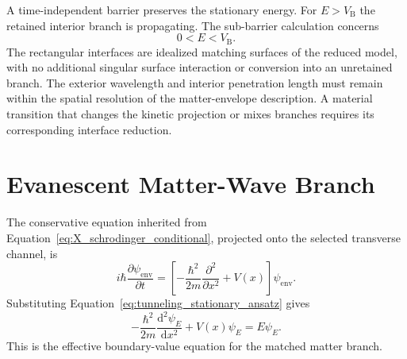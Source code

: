 A time-independent barrier preserves the stationary energy. For $E>V_{\mathrm B}$ the retained interior branch is propagating. The sub-barrier calculation concerns
\begin{equation}
    0<E<V_{\mathrm B}.
    \label{eq:tunneling_subbarrier_condition}
\end{equation}
The rectangular interfaces are idealized matching surfaces of the reduced model, with no additional singular surface interaction or conversion into an unretained branch. The exterior wavelength and interior penetration length must remain within the spatial resolution of the matter-envelope description. A material transition that changes the kinetic projection or mixes branches requires its corresponding interface reduction.

\section{Evanescent Matter-Wave Branch}
\label{sec:tunneling_evanescent_branch}

The conservative equation inherited from Equation~\eqref{eq:X_schrodinger_conditional}, projected onto the selected transverse channel, is
\begin{equation}
    i\hbar\frac{\partial\psi_{\mathrm{env}}}{\partial t}
    =\left[
        -\frac{\hbar^2}{2m}\frac{\partial^2}{\partial x^2}
        +V(x)
    \right]\psi_{\mathrm{env}}.
    \label{eq:tunneling_conservative_wave_equation}
\end{equation}
Substituting Equation~\eqref{eq:tunneling_stationary_ansatz} gives
\begin{equation}
    \boxed{
    -\frac{\hbar^2}{2m}\frac{\mathrm d^2\psi_E}{\mathrm dx^2}
    +V(x)\psi_E=E\psi_E
    }.
    \label{eq:tunneling_stationary_equation}
\end{equation}
This is the effective boundary-value equation for the matched matter branch.

